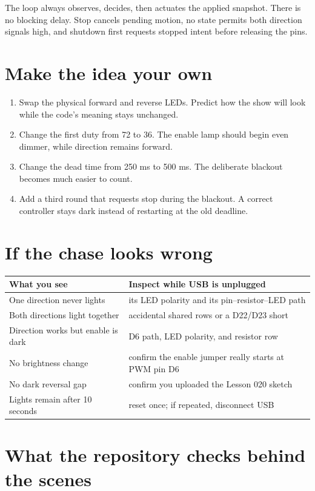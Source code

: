 \documentclass[11pt]{article}
\begin{document}
The loop always observes, decides, then actuates the applied snapshot. There is
no blocking delay. Stop cancels pending motion, no state permits both direction
signals high, and shutdown first requests stopped intent before releasing the
pins.

\section{Make the idea your own}

\begin{enumerate}
  \item Swap the physical forward and reverse LEDs. Predict how the show will
    look while the code's meaning stays unchanged.
  \item Change the first duty from 72 to 36. The enable lamp should begin even
    dimmer, while direction remains forward.
  \item Change the dead time from 250 ms to 500 ms. The deliberate blackout
    becomes much easier to count.
  \item Add a third round that requests stop during the blackout. A correct
    controller stays dark instead of restarting at the old deadline.
\end{enumerate}

\section{If the chase looks wrong}

\begin{tabularx}{\linewidth}{@{}l X@{}}
\toprule
What you see & Inspect while USB is unplugged\\
\midrule
One direction never lights & its LED polarity and its pin--resistor--LED path\\
Both directions light together & accidental shared rows or a D22/D23 short\\
Direction works but enable is dark & D6 path, LED polarity, and resistor row\\
No brightness change & confirm the enable jumper really starts at PWM pin D6\\
No dark reversal gap & confirm you uploaded the Lesson 020 sketch\\
Lights remain after 10 seconds & reset once; if repeated, disconnect USB\\
\bottomrule
\end{tabularx}

\section{What the repository checks behind the scenes}
\end{document}
